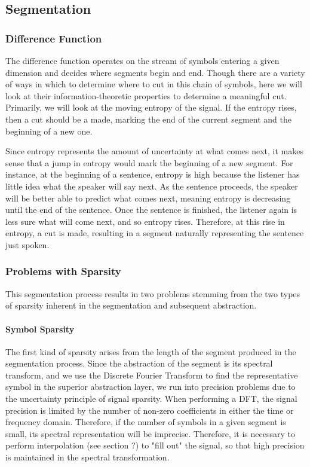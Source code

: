 
\subsection{Segmentation}

\subsubsection{Difference Function}
The difference function operates on the stream of symbols entering a given dimension and decides where segments begin and end.  Though there are a variety of ways in which to determine where to cut in this chain of symbols, here we will look at their information-theoretic properties to determine a meaningful cut. Primarily, we will look at the moving entropy of the signal.  If the entropy rises, then a cut should be a made, marking the end of the current segment and the beginning of a new one.

Since entropy represents the amount of uncertainty at what comes next, it makes sense that a jump in entropy would mark the beginning of a new segment.  For instance, at the beginning of a sentence, entropy is high because the listener has little idea what the speaker will say next. As the sentence proceeds, the speaker will be better able to predict what comes next, meaning entropy is decreasing until the end of the sentence.  Once the sentence is finished, the listener again is less sure what will come next, and so entropy rises.  Therefore, at this rise in entropy, a cut is made, resulting in a segment naturally representing the sentence just spoken.

\subsubsection{Problems with Sparsity}
This segmentation process results in two problems stemming from the two types of sparsity inherent in the segmentation and subsequent abstraction.

\paragraph{Symbol Sparsity}
The first kind of sparsity arises from the length of the segment produced in the segmentation process.  Since the abstraction of the segment is its spectral transform, and we use the Discrete Fourier Transform to find the representative symbol in the superior abstraction layer, we run into precision problems due to the uncertainty principle of signal sparsity.  When performing a DFT, the signal precision is limited by the number of non-zero coefficients in either the time or frequency domain.  Therefore, if the number of symbols in a given segment is small, its spectral representation will be imprecise.  Therefore, it is necessary to perform interpolation (see section ?) to "fill out" the signal, so that high precision is maintained in the spectral transformation.

